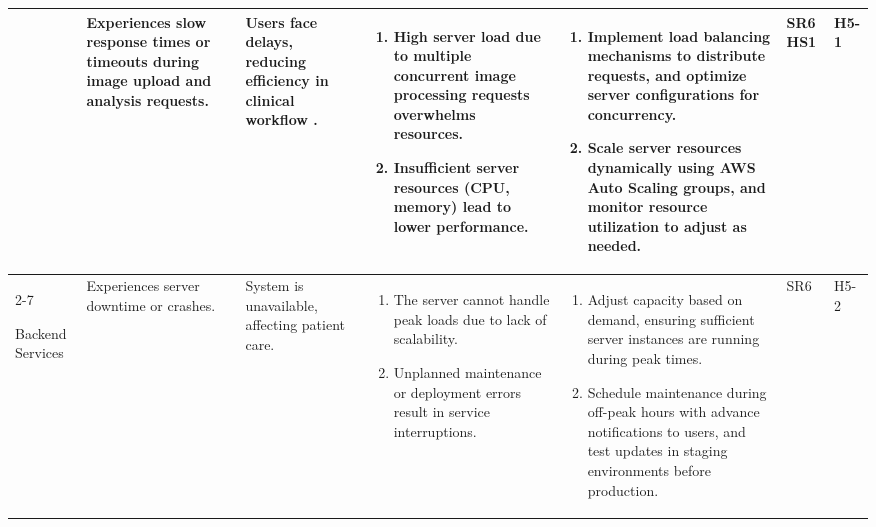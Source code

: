 \documentclass{article}
\begin{document}
\begin{landscape}
\begin{table}[ht]
{\begin{tabular}{|p{2.5cm}|p{2.5cm}|p{3cm}|p{5cm}|p{6cm}|p{1cm}|p{1cm}|}
     \multirow{2}{*}{}
     & Experiences slow response times or timeouts during image upload and analysis requests.
     & Users face delays, reducing efficiency in clinical workflow .
     &
     \begin{enumerate}[leftmargin=*, label={\alph*.}, itemsep=1pt]
         \item High server load due to multiple concurrent image processing requests overwhelms resources.
         \item Insufficient server resources (CPU, memory) lead to lower performance.
     \end{enumerate}
     &
     \begin{enumerate}[leftmargin=*, label={\alph*.}, itemsep=1pt]
         \item Implement load balancing mechanisms to distribute requests, and optimize server configurations for concurrency.
         \item Scale server resources dynamically using AWS Auto Scaling groups, and monitor resource utilization to adjust as needed.
     \end{enumerate}
     & SR6 \newline HS1 & H5-1 \\ \cline{2-7}

    Backend Services
     & Experiences server downtime or crashes.
     & System is unavailable, affecting patient care.
     &
     \begin{enumerate}[leftmargin=*, label={\alph*.}, itemsep=1pt]
         \item The server cannot handle peak loads due to lack of scalability.
         \item Unplanned maintenance or deployment errors result in service interruptions.
     \end{enumerate}
     &
     \begin{enumerate}[leftmargin=*, label={\alph*.}, itemsep=1pt]
         \item Adjust capacity based on demand, ensuring sufficient server instances are running during peak times.
         \item Schedule maintenance during off-peak hours with advance notifications to users, and test updates in staging environments before production.
     \end{enumerate}
     & SR6 & H5-2 \\ \hline

    \end{tabular}
    }
    \end{table}
\end{landscape}
\end{document}
